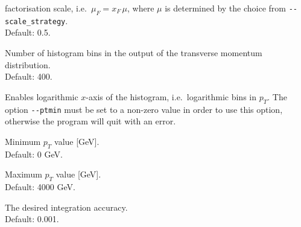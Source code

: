 \documentclass[12pt]{article}
\begin{document}
\begin{description}[labelindent=1cm, labelwidth =\widthof{\bfseries9999999999999999999999}, leftmargin = !]
        factorisation scale, i.e.\ $\mu_F=x_F\,\mu$, where $\mu$ is
        determined by the choice from \texttt{-{}-scale\_strategy}. \\
        Default: 0.5.
      \item[\texttt{-{}-nbins <value>}] Number of histogram bins in the
        output of the transverse momentum distribution. \\ Default:
        400.
      \item[\texttt{-{}-log}] Enables logarithmic $x$-axis of the
        histogram, i.e.\ logarithmic bins in $p_{T}$. The option
        \texttt{-{}-ptmin} must be set to a non-zero value in order to
        use this option, otherwise the program will quit with an
        error.
	\item[\texttt{-{}-ptmin <value>}] Minimum $p_{T}$ value [GeV]. \\ Default: 0 GeV. 
	\item[\texttt{-{}-ptmax <value>}] Maximum $p_{T}$ value [GeV]. \\ Default: 4000 GeV. 
	\item[\texttt{-{}-accuracy <value>}] The desired integration accuracy. \\ Default: 0.001. 
\end{description}
\end{document}
